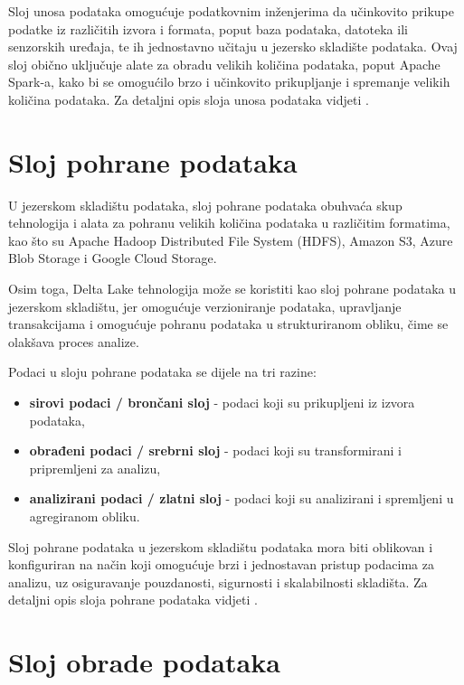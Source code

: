 Sloj unosa podataka omogućuje podatkovnim inženjerima da učinkovito prikupe
podatke iz različitih izvora i formata, poput baza podataka, datoteka ili
senzorskih uređaja, te ih jednostavno učitaju u jezersko skladište podataka.
Ovaj sloj obično uključuje alate za obradu velikih količina podataka, poput
Apache Spark-a, kako bi se omogućilo brzo i učinkovito prikupljanje i spremanje
velikih količina podataka. Za detaljni opis sloja unosa podataka vidjeti
\cite{datalakehouse2022}.

\section{Sloj pohrane podataka} \label{section:sloj_pohrane_podataka}

U jezerskom skladištu podataka, sloj pohrane podataka obuhvaća skup tehnologija
i alata za pohranu velikih količina podataka u različitim formatima, kao što su
Apache Hadoop Distributed File System (HDFS), Amazon S3, Azure Blob Storage i
Google Cloud Storage.

Osim toga, Delta Lake tehnologija može se koristiti kao sloj pohrane podataka u
jezerskom skladištu, jer omogućuje verzioniranje podataka, upravljanje
transakcijama i omogućuje pohranu podataka u strukturiranom obliku, čime se
olakšava proces analize.

Podaci u sloju pohrane podataka se dijele na tri razine:
\begin{itemize}
    \item \textbf{sirovi podaci / brončani sloj} - podaci koji su prikupljeni iz izvora podataka,
    \item \textbf{obrađeni podaci / srebrni sloj} - podaci koji su transformirani i pripremljeni za analizu,
    \item \textbf{analizirani podaci / zlatni sloj} - podaci koji su analizirani i spremljeni u agregiranom obliku.
\end{itemize}

Sloj pohrane podataka u jezerskom skladištu podataka mora biti oblikovan i
konfiguriran na način koji omogućuje brzi i jednostavan pristup podacima za
analizu, uz osiguravanje pouzdanosti, sigurnosti i skalabilnosti skladišta. Za
detaljni opis sloja pohrane podataka vidjeti \cite{datalakehouse2022}.

\section{Sloj obrade podataka} \label{section:sloj_obrade_podataka} 

